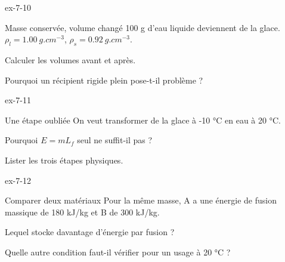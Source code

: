 \begin{blocLivre}{ex-7-10}\begin{exercice}[3]{Masse conservée, volume changé}
100 g d’eau liquide deviennent de la glace. $\rho_l=\qty{1,00}{g.cm^{-3}}$, $\rho_s=\qty{0,92}{g.cm^{-3}}$.
\begin{questions}
\item Calculer les volumes avant et après.
\item Pourquoi un récipient rigide plein pose-t-il problème ?
\end{questions}
\end{exercice}\end{blocLivre}
\begin{blocLivre}{ex-7-11}\begin{exercice}[3]{Une étape oubliée}
On veut transformer de la glace à -10 °C en eau à 20 °C.
\begin{questions}
\item Pourquoi $E=mL_f$ seul ne suffit-il pas ?
\item Lister les trois étapes physiques.
\end{questions}
\end{exercice}\end{blocLivre}
\begin{blocLivre}{ex-7-12}\begin{exercice}[3]{Comparer deux matériaux}
Pour la même masse, A a une énergie de fusion massique de 180 kJ/kg et B de 300 kJ/kg.
\begin{questions}
\item Lequel stocke davantage d’énergie par fusion ?
\item Quelle autre condition faut-il vérifier pour un usage à 20 °C ?
\end{questions}
\end{exercice}\end{blocLivre}

